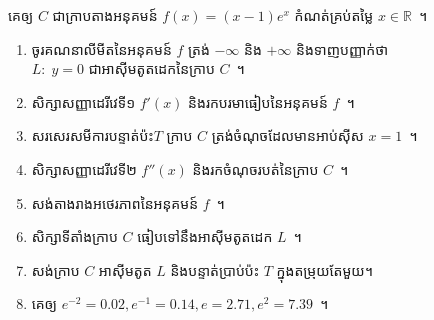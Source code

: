 \documentclass[a5paper,10pt,fleqn]{article}
\newenvironment{exercise}{\begin{tcolorbox}[frame,title=លំហាត់]}{\end{tcolorbox}}
\begin{document}
\begin{exercise}
	គេឲ្យ $ C $ ជាក្រាបតាងអនុគមន៍ $ f(x)=(x-1)e^x $ កំណត់គ្រប់តម្លៃ $ x\in\mathbb{R} $~។
	\begin{enumerate}
		\item ចូរគណនាលីមីតនៃអនុគមន៍ $ f $ ត្រង់ $ -\infty $ និង $ +\infty $ និងទាញបញ្ញាក់ថា\\
		$ L:\; y=0 $ ជាអាស៊ីមតូតដេកនៃក្រាប $ C $~។
		\item សិក្សាសញ្ញាដេរីវេទី១ $ f'(x) $ និងរកបរមាធៀបនៃអនុគមន៍ $ f $~។
		\item សរសេរសមីការបន្ទាត់ប៉ះ​ $ T $ ក្រាប $ C $ ត្រង់ចំណុចដែលមានអាប់ស៊ីស $ x=1 $~។
		\item សិក្សាសញ្ញាដេរីវេទី២ $ f''(x) $ និងរកចំណុចរបត់នៃក្រាប $ C $~។
		\item សង់តាងរាងអថេរភាពនៃអនុគមន៍ $ f $~។
		\item សិក្សាទីតាំងក្រាប $ C $ ធៀបទៅនឹងអាស៊ីមតូតដេក $ L $~។
		\item សង់ក្រាប $ C $ អាស៊ីមតូត $ L $ និងបន្ទាត់ប្រាប់ប៉ះ $ T $ ក្នុងតម្រុយតែមួយ។
		\item[] គេឲ្យ $ e^{-2}=0.02,e^{-1}=0.14,e=2.71,e^2=7.39 $~។
	\end{enumerate}
\end{exercise}
\end{document}
